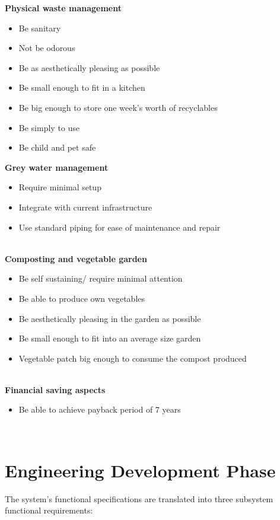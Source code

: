 \documentclass[a4paper,11pt,fleqn]{report}
\begin{document}
\noindent\textbf{Physical waste management}
\begin{itemize}
\item Be sanitary
\item Not be odorous
\item Be as aesthetically pleasing as possible
\item Be small enough to fit in a kitchen
\item Be big enough to store one week's worth of recyclables
\item Be simply to use
\item Be child and pet safe
\end{itemize}

\noindent\textbf{Grey water management}
\begin{itemize}
\item Require minimal setup
\item Integrate with current infrastructure
\item Use standard piping for ease of maintenance and repair
\end{itemize}\\

\noindent\textbf{Composting and vegetable garden}
\begin{itemize}
\item Be self sustaining/ require minimal attention
\item Be able to produce own vegetables
\item Be aesthetically pleasing in the garden as possible
\item Be small enough to fit into an average size garden
\item Vegetable patch big enough to consume the compost produced
\end{itemize}\\

\noindent\textbf{Financial saving aspects }
\begin{itemize}
\item Be able to achieve payback period of 7 years
\end{itemize}\\

\chapter{Engineering Development Phase}
The system's functional specifications are translated into three subsystem functional requirements:\\
\end{document}

